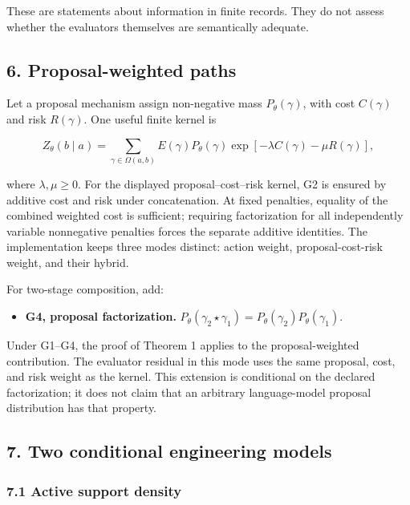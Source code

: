 \documentclass[
  11pt,
]{article}
\providecommand{\tightlist}{%
  \setlength{\itemsep}{0pt}\setlength{\parskip}{0pt}}
\theoremstyle{plain}
\theoremstyle{definition}\newtheorem{definition}[theorem]{Definition}
\theoremstyle{remark}\newtheorem*{remark}{Remark}
\begin{document}
These are statements about information in finite records. They do not assess
whether the evaluators themselves are semantically adequate.

\subsection{6. Proposal-weighted paths}\label{proposal-weighted-paths}

Let a proposal mechanism assign non-negative mass \(P_\theta(\gamma)\), with
cost \(C(\gamma)\) and risk \(R(\gamma)\). One useful finite kernel is

\[
Z_\theta(b\mid a)=
\sum_{\gamma\in\Omega(a,b)}
E(\gamma)P_\theta(\gamma)
\exp[-\lambda C(\gamma)-\mu R(\gamma)],
\]

where \(\lambda,\mu\ge0\). For the displayed proposal--cost--risk kernel, G2
is ensured by additive cost and risk under concatenation. At fixed penalties,
equality of the combined weighted cost is sufficient; requiring factorization
for all independently variable nonnegative penalties forces the separate
additive identities. The implementation keeps three modes distinct:
action weight, proposal-cost-risk weight, and their hybrid.

For two-stage composition, add:

\begin{itemize}
\tightlist
\item
  \textbf{G4, proposal factorization.}
  \(P_\theta(\gamma_2\star\gamma_1)
   =P_\theta(\gamma_2)P_\theta(\gamma_1)\).
\end{itemize}

Under G1--G4, the proof of Theorem 1 applies to the proposal-weighted
contribution. The evaluator residual in this mode uses the same proposal,
cost, and risk weight as the kernel. This extension is conditional on the
declared factorization; it does not claim that an arbitrary language-model
proposal distribution has that property.

\subsection{7. Two conditional engineering models}\label{two-conditional-engineering-models}

\subsubsection{7.1 Active support density}\label{active-support-density}
\end{document}
